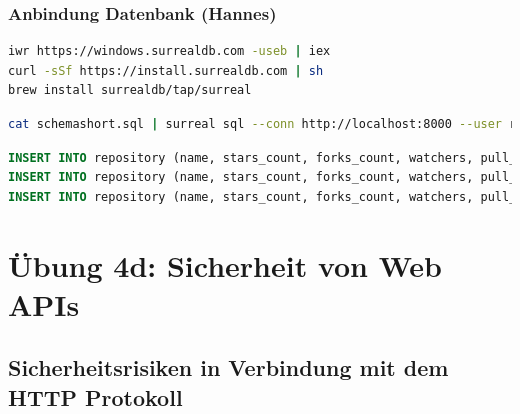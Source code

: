 \documentclass[notitlepage, hidelinks]{article}
\begin{document}
\subsubsection{Anbindung Datenbank (Hannes)} \label{anbindungdatenbank}


\begin{lstlisting}[language=bash,frame=single,caption=CLI Kommandos zur lokalen Installation der Datenbank für Windows\, Linux und macOS,label=dbinstall]
iwr https://windows.surrealdb.com -useb | iex
curl -sSf https://install.surrealdb.com | sh
brew install surrealdb/tap/surreal
\end{lstlisting}

\begin{lstlisting}[language=bash,frame=single,caption=CLI Kommando zur Übertragung der Daten aus der Datei in Listing \ref{sqldbone},label=dbsetup]
cat schemashort.sql | surreal sql --conn http://localhost:8000 --user root --pass root --ns base --db base
\end{lstlisting}


\begin{lstlisting}[language=SQL,frame=single,caption=Ausschnitt der sql Setupdatei,label=sqldbone]
INSERT INTO repository (name, stars_count, forks_count, watchers, pull_requests, primary_language, languages_used, commit_count, created_at, licence) VALUES ('react', 159266, 30464, 8497, 2911, lang:JavaScript, [lang:JavaScript, lang:HTML, lang:CSS], 5562, '2013-05-24T16:15:54Z', 'MIT License');
INSERT INTO repository (name, stars_count, forks_count, watchers, pull_requests, primary_language, languages_used, commit_count, created_at, licence) VALUES ('scikit-learn', 38327, 18225, 4968, 1701, lang:Python, [lang:Python, lang:Cython, lang:HTML, lang:CSS], 4085, '2010-01-10T09:58:52Z', 'BSD-3-Clause License');
INSERT INTO repository (name, stars_count, forks_count, watchers, pull_requests, primary_language, languages_used, commit_count, created_at, licence) VALUES ('angular', 68521, 24536, 6779, 2197, lang:TypeScript, [lang:TypeScript, lang:JavaScript, lang:HTML, lang:CSS], 4248, '2014-09-18T16:12:01Z', 'MIT License');
\end{lstlisting}



\newpage
\section{Übung 4d: Sicherheit von Web APIs}
\subsection{Sicherheitsrisiken in Verbindung mit dem HTTP Protokoll}
\end{document}

